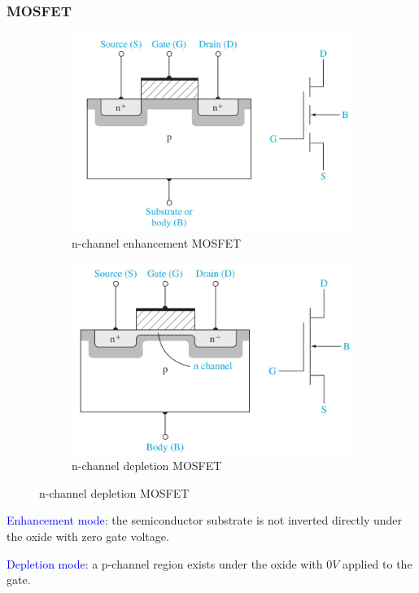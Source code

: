 \documentclass{beamer}
\begin{document}
    \begin{frame} \frametitle{MOSFET}
        \begin{figure}[H]
            \centering
            \begin{subfigure}[t]{0.45\linewidth}
                \centering
                \includegraphics[width=0.9\linewidth]{NMOS-enhancement.jpg}
                \caption{n-channel enhancement MOSFET}
                \label{subfig:NMOS-enhancement.jpg}
            \end{subfigure}
            \begin{subfigure}[t]{0.45\linewidth}
                \centering
                \includegraphics[width=0.9\linewidth]{NMOS-depletion.jpg}
                \caption{n-channel depletion MOSFET}
                \label{subfig:NMOS-depletion.jpg}
            \end{subfigure}
        \end{figure}
        
        \par \textcolor{blue}{Enhancement mode}: the semiconductor substrate is not inverted directly under the oxide with zero gate voltage.
        \par \textcolor{blue}{Depletion mode}: a p-channel region exists under the oxide with $0V$ applied to the gate.
    \end{frame}
\end{document}

